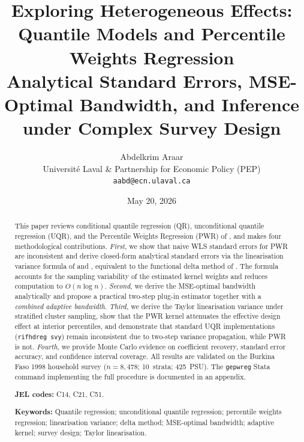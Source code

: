 \documentclass[12pt,a4paper]{article}
\theoremstyle{definition}
\begin{document}
\setlength{\tabcolsep}{5pt}   %

\title{\textbf{Exploring Heterogeneous Effects:\\
Quantile Models and Percentile Weights Regression}\\[0.5em]
\large Analytical Standard Errors, MSE-Optimal Bandwidth,
and Inference under Complex Survey Design}

\author{Abdelkrim Araar\\
\small Universit\'{e} Laval \& Partnership for Economic Policy (PEP)\\
\small \texttt{aabd@ecn.ulaval.ca}}
\date{May 20, 2026}
\maketitle

\begin{abstract}
\noindent
This paper reviews conditional quantile regression (QR), unconditional
quantile regression (UQR), and the Percentile Weights Regression (PWR)
of \citet{Araar2016,Araar2023}, and makes four methodological
contributions. \textit{First}, we show that naive WLS standard errors
for PWR are inconsistent and derive closed-form analytical standard
errors via the linearisation variance formula of \citet{Rao1979} and
\citet{Deville1999}, equivalent to the functional delta method of
\citet{vonMises1947}. The formula accounts for the sampling variability
of the estimated kernel weights and reduces computation to $O(n\log n)$.
\textit{Second}, we derive the MSE-optimal bandwidth analytically and
propose a practical two-step plug-in estimator together with a
\textit{combined adaptive bandwidth}. \textit{Third}, we derive the
Taylor linearisation variance under stratified cluster sampling, show
that the PWR kernel attenuates the effective design effect at interior
percentiles, and demonstrate that standard UQR implementations
(\texttt{rifhdreg svy}) remain inconsistent due to two-step variance
propagation, while PWR is not. \textit{Fourth}, we provide Monte Carlo
evidence on coefficient recovery, standard error accuracy, and confidence
interval coverage. All results are validated on the Burkina Faso 1998
household survey ($n=8{,}478$; 10~strata; 425~PSU). The
\texttt{gepwreg} Stata command implementing the full procedure is
documented in an appendix.

\bigskip\noindent
\textbf{JEL codes:} C14, C21, C51.\\
{\raggedright\textbf{Keywords:} Quantile regression; unconditional quantile
regression; percentile weights regression; linearisation variance; delta
method; MSE-optimal bandwidth; adaptive kernel; survey design; Taylor
linearisation.\par}
\end{abstract}
\setlength{\emergencystretch}{3em}
\end{document}
